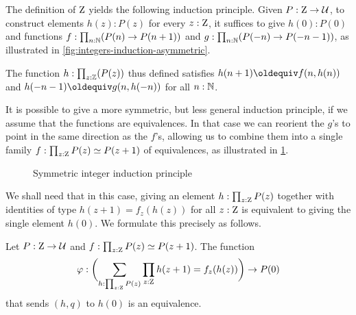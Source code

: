 \documentclass[a4paper,12pt]{amsart}
\begin{document}
The definition of $\mathrm{Z}$ yields the following induction principle.
Given $P : \mathrm{Z} \to \mathcal{U}$, to construct elements $h(z) : P(z)$ for every $z : \mathrm{Z}$,
it suffices to give $h(0): P(0)$ and functions
$f : \prod_{n:\mathbb{N}}(P(n) \to P(n+1))$ and
$g : \prod_{n:\mathbb{N}}(P(-n) \to P(-n-1))$,
as illustrated in \cref{fig:integers-induction-asymmetric}.

The function $h:\prod_{z:\mathbb{Z}}(P(z))$ thus defined satisfies
$h(n+1)\jdeq f(n,h(n))$ and $h(-n-1)\jdeq g(n,h(-n))$ for all $n:\mathbb{N}$.

It is possible to give a more symmetric, but less general induction principle,
if we assume that the functions are equivalences.
In that case we can reorient the $g$'s to point in the same direction as the $f$'s,
allowing us to combine them into a single family $f : \prod_{z:\mathrm{Z}}P(z) \simeq P(z+1)$ of equivalences,
as illustrated in \cref{fig:integers-induction-symmetric}.

\begin{figure}[h]
  \centering
  \caption{Symmetric integer induction principle}
  \label{fig:integers-induction-symmetric}
\end{figure}

We shall need that in this case, giving an element $h:\prod_{z:\mathrm{Z}}P(z)$
together with identities of type $h(z+1) = f_z(h(z))$ for all $z:\mathrm{Z}$
is equivalent to giving the single element $h(0)$.
We formulate this precisely as follows.

\begin{theorem}\label{thm:integers-univ-symm}
  Let $P : \mathrm{Z} \to \mathcal{U}$ and $f : \prod_{z:\mathrm{Z}}P(z) \simeq P(z+1)$. The function
  \[
    \varphi : \biggl(\sum_{h:\prod_{z:\mathrm{Z}}P(z)}\prod_{z:\mathrm{Z}}h(z+1) = f_z(h(z))\biggr) \to P(0)
  \]
  that sends $(h,q)$ to $h(0)$ is an equivalence.
\end{theorem}
\end{document}
